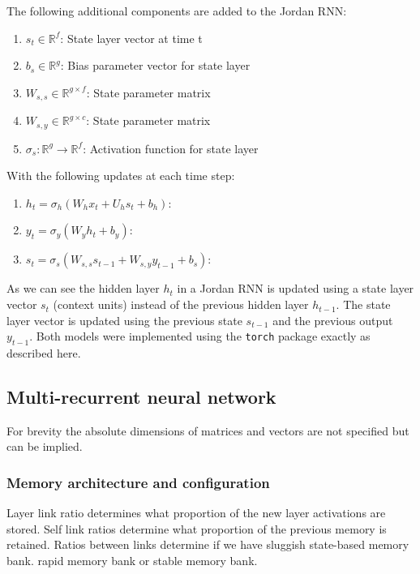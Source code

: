 \documentclass[conference]{IEEEtran}
\begin{document}
The following additional components are added to the Jordan RNN:

\begin{enumerate}
	\item $s_t \in \mathbb{R}^f$: State layer vector at time t
	
	\item $b_s \in \mathbb{R}^{g}$: Bias parameter vector for state layer
	
	\item $W_{s,s} \in \mathbb{R}^{g \times f}$: State parameter matrix
	\item $W_{s,y} \in \mathbb{R}^{g \times c}$: State parameter matrix
	
	\item $\sigma_s: \mathbb{R}^g \to \mathbb{R}^f$: Activation function for state layer
	
	
	
\end{enumerate}

With the following updates at each time step:

\begin{enumerate}
	\item $h_t = \sigma_h(W_h x_t + U_h s_t + b_h)$: 
	\item $y_t = \sigma_y(W_y h_t + b_y)$: 
	\item $s_t = \sigma_s(W_{s,s} s_{t-1} + W_{s,y} y_{t-1} + b_s)$: 
\end{enumerate}

As we can see the hidden layer $h_t$ in a Jordan RNN is updated using a state layer vector $s_t$ (context units) instead of the previous hidden layer $h_{t-1}$. The state layer vector is updated using the previous state $s_{t-1}$ and the previous output $y_{t-1}$. Both models were implemented using the \texttt{torch} package exactly as described here.


\subsection{Multi-recurrent neural network}

For brevity the absolute dimensions of matrices and vectors are not specified but can be implied.

\subsubsection{Memory architecture and configuration}

Layer link ratio determines what proportion of the new layer activations are stored. Self link ratios determine what proportion of the previous memory is retained. Ratios between links determine if we have sluggish state-based memory bank. rapid memory bank or stable memory bank.
\end{document}
